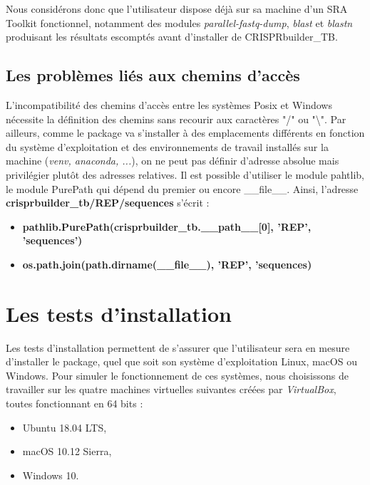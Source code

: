 \documentclass[twoside,a4paper,11pt,frenchb,openany]{report}
\begin{document}
Nous considérons donc que l'utilisateur dispose déjà sur sa machine d'un SRA Toolkit fonctionnel, notamment des modules \textit{parallel-fastq-dump}, \textit{blast} et \textit{blastn} produisant les résultats escomptés avant d'installer de CRISPRbuilder\_TB.



\subsection{Les problèmes liés aux chemins d'accès}

L'incompatibilité des chemins d'accès entre les systèmes Posix et Windows nécessite la définition des chemins sans recourir aux caractères "/" ou "\textbackslash". Par ailleurs, comme le package va s'installer à des emplacements différents en fonction du système d'exploitation et des environnements de travail installés sur la machine (\textit{venv, anaconda, ...}), on ne peut pas définir d'adresse absolue mais privilégier plutôt des adresses relatives. Il est possible d'utiliser le module pahtlib, le module PurePath qui dépend du premier ou encore \_\_file\_\_. Ainsi, l'adresse  \textbf{crisprbuilder\_tb/REP/sequences} s'écrit :
\begin{itemize}
\item \textbf{pathlib.PurePath(crisprbuilder\_tb.\_\_path\_\_[0], 'REP', 'sequences')}
\item \textbf{os.path.join(path.dirname(\_\_file\_\_), 'REP', 'sequences)}
\end{itemize}






\section{Les tests d'installation}

Les tests d'installation permettent de s'assurer que l'utilisateur sera en mesure d'installer le package, quel que soit son système d'exploitation Linux, macOS ou Windows. Pour simuler le fonctionnement de ces systèmes, nous choisissons de travailler sur les quatre machines virtuelles suivantes créées par \textit{VirtualBox}, toutes fonctionnant en 64 bits : 
\begin{itemize}
\item Ubuntu 18.04 LTS, 
\item macOS 10.12 Sierra, 
\item Windows 10.
\end{itemize}
\end{document}
